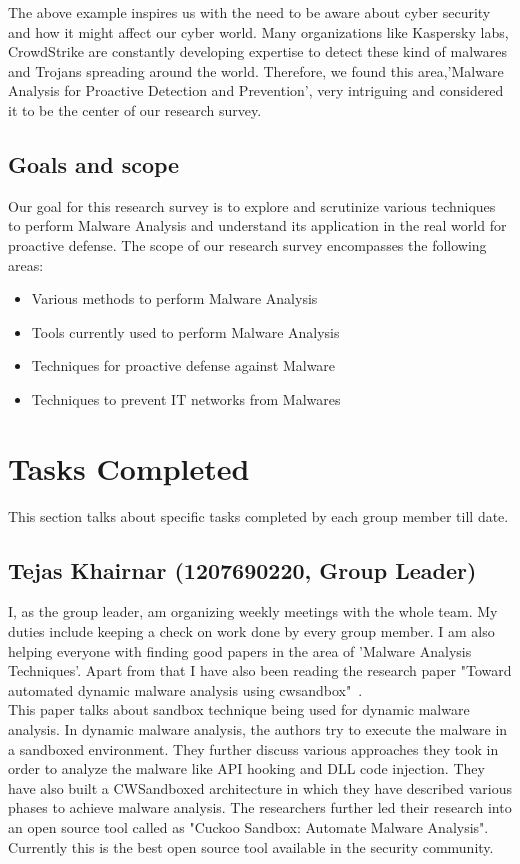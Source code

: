 \documentclass[16pt]{article}
\begin{document}
The above example inspires us with the need to be aware about cyber security and how it might affect our cyber world. Many organizations like Kaspersky labs, CrowdStrike are constantly developing expertise to detect these kind of malwares and Trojans spreading around the world. Therefore, we found this area,'Malware Analysis for Proactive Detection and Prevention', very intriguing and considered it to be the center of our research survey.
	\subsection{Goals and scope}
	Our goal for this research survey is to explore and scrutinize various techniques to perform Malware Analysis and understand its application in the real world for proactive defense.
	The scope of our research survey encompasses the following areas:
	\begin{itemize}
		\item{Various methods to perform Malware Analysis}
		\item{Tools currently used to perform Malware Analysis} 
		\item{Techniques for proactive defense against Malware}
		\item{Techniques to prevent IT networks from Malwares}
	\end{itemize}
	
	\section{Tasks Completed}
	This section talks about specific tasks completed by each group member till date.
		\subsection{Tejas Khairnar (1207690220, Group Leader)}
		I, as the group leader, am organizing weekly meetings with the whole team. My duties include keeping a check on work done by every group member.
		I am also helping everyone with finding good papers in the area of 'Malware Analysis Techniques'. Apart from that I have also been reading the research paper "Toward automated dynamic malware analysis using cwsandbox"~\cite{willems2007toward}. \\
		
		This paper talks about sandbox technique being used for dynamic malware analysis. In dynamic malware analysis, the authors try to execute the malware in a sandboxed environment. They further discuss various approaches they took in order to analyze the malware like API hooking and DLL code injection. They have also built a CWSandboxed architecture in which they have described various phases to achieve malware analysis. The researchers further led their research into an open source tool called as "Cuckoo Sandbox: Automate Malware Analysis". Currently this is the best open source tool available in the security community.\\
\end{document}
